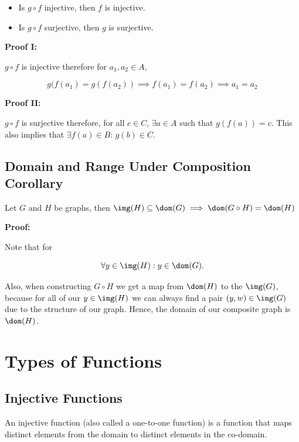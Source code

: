 \begin{itemize}

	\item Is \(g \circ f\) injective, then \(f\) is injective.

	\item Is \(g \circ f\) surjective, then \(g\) is surjective.

\end{itemize}

\textbf{Proof I:}

\(g \circ f\) is injective therefore for \(a_1, a_2 \in A\), 

\[ 
	g(f(a_1) = g(f(a_2)) \implies f(a_1) = f(a_2) \implies a_1 = a_2
\]

\QED

\textbf{Proof II:}

\(g \circ f\) is surjective therefore, for all \(c \in C, \, \exists a \in A\) such that \(g(f(a)) = c\). This also 
implies that \(\exists f(a) \in B: \, g(b) \in C\). 

\QED

\subsection{Domain and Range Under Composition Corollary}

Let \(G\) and \(H\) be graphs, then \(\img(H) \subseteq \dom(G) \implies \dom(G \circ H) = \dom(H)\)

\textbf{Proof:}

Note that for 

\[
	\forall y \in \img(H) : y \in \dom (G).
\]

Also, when constructing \(G \circ H\) we get a map from \(\dom(H)\) to the \(\img(G)\), because for all 
of our \(y \in \img(H)\) we can always find a pair \((y, w) \in \img(G)\) due to the structure of our graph. Hence, 
the domain of our composite graph is \(\dom(H)\).

\QED

\section{Types of Functions}

\subsection{Injective Functions}

An injective function (also called a one-to-one function) is a 
function that maps distinct elements from the domain to distinct elements in the co-domain.

